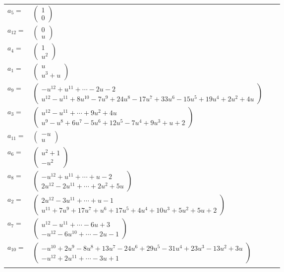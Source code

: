 \documentclass[1p]{elsarticle_modified}
\theoremstyle{definition}
\begin{document}
\begin{tabular}{m{7pt} m{180pt} m{7pt} m{180pt} }
\flushright $a_{5}=$&$\begin{pmatrix}1\\0\end{pmatrix}$ \\
\flushright $a_{12}=$&$\begin{pmatrix}0\\u\end{pmatrix}$ \\
\flushright $a_{4}=$&$\begin{pmatrix}1\\u^2\end{pmatrix}$ \\
\flushright $a_{1}=$&$\begin{pmatrix}u\\u^3+u\end{pmatrix}$ \\
\flushright $a_{9}=$&$\begin{pmatrix}- u^{12}+u^{11}+\cdots-2 u-2\\u^{12}- u^{11}+8 u^{10}-7 u^9+24 u^8-17 u^7+33 u^6-15 u^5+19 u^4+2 u^2+4 u\end{pmatrix}$ \\
\flushright $a_{3}=$&$\begin{pmatrix}u^{12}- u^{11}+\cdots+9 u^2+4 u\\u^9- u^8+6 u^7-5 u^6+12 u^5-7 u^4+9 u^3+u+2\end{pmatrix}$ \\
\flushright $a_{11}=$&$\begin{pmatrix}- u\\u\end{pmatrix}$ \\
\flushright $a_{6}=$&$\begin{pmatrix}u^2+1\\- u^2\end{pmatrix}$ \\
\flushright $a_{8}=$&$\begin{pmatrix}- u^{12}+u^{11}+\cdots+u-2\\2 u^{12}-2 u^{11}+\cdots+2 u^2+5 u\end{pmatrix}$ \\
\flushright $a_{2}=$&$\begin{pmatrix}2 u^{12}-3 u^{11}+\cdots+u-1\\u^{11}+7 u^9+17 u^7+u^6+17 u^5+4 u^4+10 u^3+5 u^2+5 u+2\end{pmatrix}$ \\
\flushright $a_{7}=$&$\begin{pmatrix}u^{12}- u^{11}+\cdots-6 u+3\\- u^{12}-6 u^{10}+\cdots-2 u-1\end{pmatrix}$ \\
\flushright $a_{10}=$&$\begin{pmatrix}- u^{10}+2 u^9-8 u^8+13 u^7-24 u^6+29 u^5-31 u^4+23 u^3-13 u^2+3 u\\- u^{12}+2 u^{11}+\cdots-3 u+1\end{pmatrix}$\\&\end{tabular}
\end{document}
